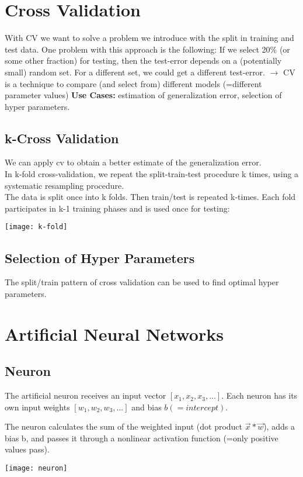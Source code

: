 \section{Cross Validation}
With CV we want to solve a problem we introduce with the split in training and test data.  One problem with this approach is the following: If we select 20\% (or some other fraction) for testing, then the test-error depends on a (potentially small) random set. For a different set, we could get a different test-error. $\rightarrow$ CV is a technique to compare (and select from) different models (=different parameter values) \textbf{Use Cases:} estimation of generalization error, selection of hyper parameters.

\subsection{k-Cross Validation}
\begin{minipage}{0,5\linewidth}
	We can apply cv to obtain a better estimate of the generalization error.\\
	In k-fold cross-validation, we repeat the split-train-test procedure k times, using a systematic resampling procedure.\\
	The data is split once into k folds. Then train/test is repeated k-times. Each fold participates in k-1 training phases and is used once for testing:
 
\end{minipage}
\begin{minipage}{0,5\linewidth}
	\texttt{[image: k-fold]}
\end{minipage}

\subsection{Selection of Hyper Parameters}
The split/train pattern of cross validation can be used to find optimal hyper parameters.

\section{Artificial Neural Networks}
\subsection{Neuron}
\begin{minipage}{0,5\linewidth}
	The artificial neuron receives an input vector $[x_{1},x_{2},x_{3},...]$. Each neuron has its own input weights $[w_{1},w_{2},w_{3},...]$ and bias $b (=intercept)$.
	
	The neuron calculates the sum of the weighted input (dot product $\vec{x} * \vec{w}$), adds a bias b, and passes it through a nonlinear activation function (=only positive values pass).
\end{minipage}
\begin{minipage}{0,5\linewidth}
	\texttt{[image: neuron]}
\end{minipage}

